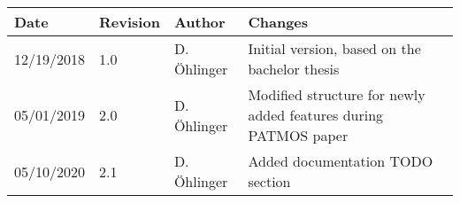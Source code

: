 \begin{center}
\begin{tabularx}{\linewidth}{ |l|l|l|X| } 
 \hline
 Date & Revision & Author & Changes \\ 
 \hline
 12/19/2018 & 1.0 & D. \"Ohlinger & Initial version, based on the bachelor 
 thesis \cite{Oeh18:Bthesis} \\ 
 \hline
 05/01/2019 & 2.0 & D. \"Ohlinger & Modified structure for newly added features 
 during PATMOS paper  \\ 
 \hline
 05/10/2020 & 2.1 & D. \"Ohlinger & Added documentation TODO section  \\ 
 \hline
\end{tabularx}
\end{center}